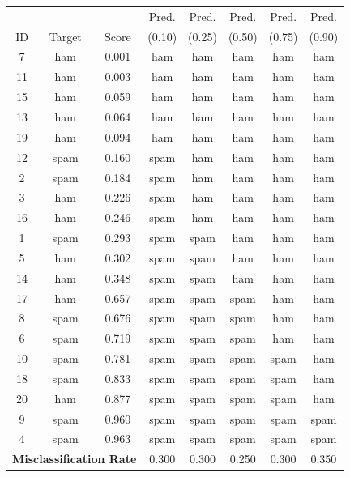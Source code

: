 \documentclass[xcolor={table}]{beamer}
\newcommand{\featN}[1]{\textsc{#1}}
\begin{document}
 \begin{frame} [plain]
\begin{table}[!tb]
\label{tab:samplePredictionExampleChaginingThresh}
\centering
\begin{scriptsize}
\begin{tabular}{  c  c  c  c  c  c  c  c }
\hline
~	 &  &  & Pred. & Pred. & Pred. & Pred. & Pred.	 \\
\featN{ID}	 & Target & Score & (0.10) & (0.25) & (0.50) & (0.75) & (0.90)	 \\
\hline
7	&	ham	&	0.001	&	ham	&	ham	&	ham	&	ham	&	ham	\\
11	&	ham	&	0.003	&	ham	&	ham	&	ham	&	ham	&	ham	\\
15	&	ham	&	0.059	&	ham	&	ham	&	ham	&	ham	&	ham	\\
13	&	ham	&	0.064	&	ham	&	ham	&	ham	&	ham	&	ham	\\
19	&	ham	&	0.094	&	ham	&	ham	&	ham	&	ham	&	ham	\\
12	&	spam	&	0.160	&	spam	&	ham	&	ham	&	ham	&	ham	\\
2	&	spam	&	0.184	&	spam	&	ham	&	ham	&	ham	&	ham	\\
3	&	ham	&	0.226	&	spam	&	ham	&	ham	&	ham	&	ham	\\
16	&	ham	&	0.246	&	spam	&	ham	&	ham	&	ham	&	ham	\\
1	&	spam	&	0.293	&	spam	&	spam	&	ham	&	ham	&	ham	\\
5	&	ham	&	0.302	&	spam	&	spam	&	ham	&	ham	&	ham	\\
14	&	ham	&	0.348	&	spam	&	spam	&	ham	&	ham	&	ham	\\
17	&	ham	&	0.657	&	spam	&	spam	&	spam	&	ham	&	ham	\\
8	&	spam	&	0.676	&	spam	&	spam	&	spam	&	ham	&	ham	\\
6	&	spam	&	0.719	&	spam	&	spam	&	spam	&	ham	&	ham	\\
10	&	spam	&	0.781	&	spam	&	spam	&	spam	&	spam	&	ham	\\
18	&	spam	&	0.833	&	spam	&	spam	&	spam	&	spam	&	ham	\\
20	&	ham	&	0.877	&	spam	&	spam	&	spam	&	spam	&	ham	\\
9	&	spam	&	0.960	&	spam	&	spam	&	spam	&	spam	&	spam	\\
4	&	spam	&	0.963	&	spam	&	spam	&	spam	&	spam	&	spam	\\									
\hline 
\multicolumn{3}{r}{\textbf{Misclassification Rate}}	&	0.300	&	0.300	&	0.250	&	0.300	&	0.350	\\

\end{tabular}
\end{scriptsize}
\end{table}
\end{frame}
\end{document}
